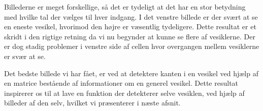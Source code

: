Billederne er meget forskellige, så det er tydeligt at det har en stor betydning med hvilke tal der vælges til hver indgang. I det venstre billede er der svært at se en eneste vesikel, hvorimod den højre er væsentlig tydeligere. Dette resultat er et skridt i den rigtige retning da vi nu begynder at kunne se flere af vesiklerne. Der er dog stadig problemer i venstre side af cellen hvor overgangen mellem vesiklerne er svær at se.

Det bedste billede vi har fået, er ved at detektere kanten i en vesikel ved hjælp af en matrice bestående af informationer om en generel vesikel. Dette resultat inspirerer os til at lave en funktion der detekterer selve vesiklen, ved hjælp af billeder af den selv, hvilket vi præsenterer i næste afsnit. %

